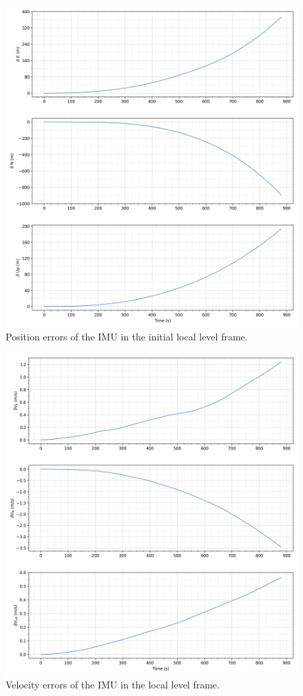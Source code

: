 \documentclass[11pt, oneside]{article}   	%
\begin{document}
\begin{figure}[!htbp]
\centerline{\includegraphics[width=16cm]{img/position_errors.png}}
\caption{\label{fig:position-errors} Position errors of the IMU in the initial local level frame.}
\end{figure}

\begin{figure}[!htbp]
\centerline{\includegraphics[width=16cm]{img/velocity_errors.png}}
\caption{\label{fig:velocity-errors} Velocity errors of the IMU in the local level frame.}
\end{figure}
\end{document}

